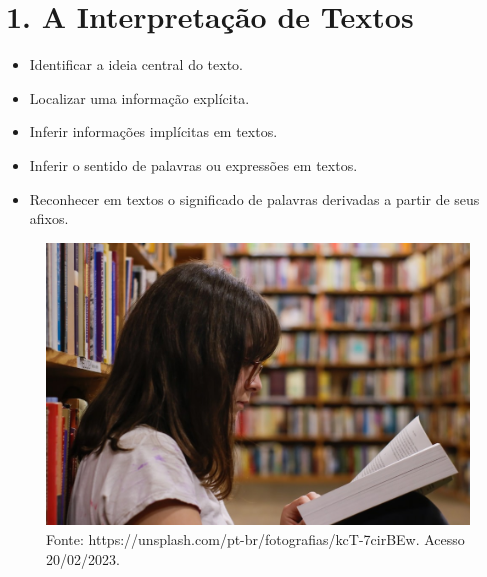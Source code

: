\chapter{1. A Interpretação de Textos}



\begin{itemize}
\item Identificar a ideia central do texto.

\item Localizar uma informação explícita.

\item Inferir informações implícitas em textos.

\item Inferir o sentido de palavras ou expressões em textos.

\item Reconhecer em textos o significado de palavras derivadas a partir de
seus afixos.
\end{itemize}

\begin{figure}[htpb!]
\includegraphics[width=.5\textwidth]{./imgs/img1.jpg}
\caption{Fonte: https://unsplash.com/pt-br/fotografias/kcT-7cirBEw. Acesso 20/02/2023.}
\end{figure}

